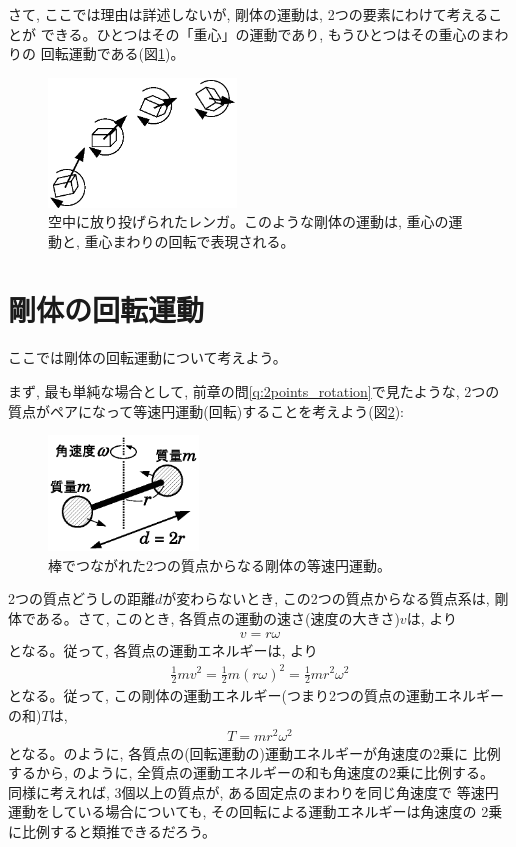 さて, ここでは理由は詳述しないが, 剛体の運動は, 2つの要素にわけて考えることが
できる。ひとつはその「重心」の運動であり, もうひとつはその重心のまわりの
回転運動である(図\ref{fig:rigid_motion})。

\begin{figure}[h]
    \centering
    \includegraphics[width=5.0cm]{rigid_motion.eps}
    \caption{空中に放り投げられたレンガ。このような剛体の運動は, 重心の運動と, 重心まわりの回転で表現される。}\label{fig:rigid_motion}
\end{figure}
\hv

\section{剛体の回転運動}

ここでは剛体の回転運動について考えよう。

まず, 最も単純な場合として, 前章の問\ref{q:2points_rotation}で見たような, 
2つの質点がペアになって等速円運動(回転)することを考えよう(図\ref{fig:angular_mom_2balls}):
\begin{figure}[h]
    \centering
    \includegraphics[width=4.0cm]{angular_mom_2balls.eps}
    \caption{棒でつながれた2つの質点からなる剛体の等速円運動。}\label{fig:angular_mom_2balls}
\end{figure}

2つの質点どうしの距離$d$が変わらないとき, この2つの質点からなる質点系は, 
剛体である。さて, このとき, 各質点の運動の速さ(速度の大きさ)$v$は, より
\begin{eqnarray}
v=r\omega
\end{eqnarray}
となる。従って, 各質点の運動エネルギーは, より
\begin{eqnarray}
\frac{1}{2}mv^2=\frac{1}{2}m(r\omega)^2=\frac{1}{2}mr^2\omega^2\label{eq:rot_kineticE}
\end{eqnarray}
となる。従って, この剛体の運動エネルギー(つまり2つの質点の運動エネルギーの和)$T$は, 
\begin{eqnarray}
T=mr^2\omega^2\label{eq:rot_kineticE2}
\end{eqnarray}
となる。のように, 各質点の(回転運動の)運動エネルギーが角速度の2乗に
比例するから, のように, 全質点の運動エネルギーの和も角速度の2乗に比例する。
同様に考えれば, 3個以上の質点が, ある固定点のまわりを同じ角速度で
等速円運動をしている場合についても, その回転による運動エネルギーは角速度の
2乗に比例すると類推できるだろう。\hv


